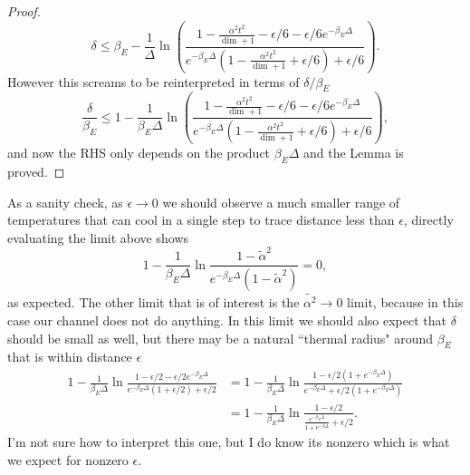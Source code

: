 \documentclass{article}
\begin{document}
\begin{proof}
\begin{equation}
    \delta \le \beta_E - \frac{1}{\Delta}  \ln \left( \frac{1 - \frac{\alpha^2 t^2}{\dim + 1} - \epsilon/ 6 - \epsilon/6 e^{-\beta_E \Delta}}{e^{-\beta_E \Delta}(1 - \frac{\alpha^2 t^2}{\dim + 1} + \epsilon/6) + \epsilon / 6} \right).
\end{equation}
However this screams to be reinterpreted in terms of $\delta / \beta_E$
\begin{equation}
    \frac{\delta}{\beta_E} \le 1 - \frac{1}{\beta_E \Delta}  \ln \left( \frac{1 - \frac{\alpha^2 t^2}{\dim + 1} - \epsilon/ 6 - \epsilon/6 e^{-\beta_E \Delta}}{e^{-\beta_E \Delta}(1 - \frac{\alpha^2 t^2}{\dim + 1} + \epsilon/6) + \epsilon / 6} \right),
\end{equation}
and now the RHS only depends on the product $\beta_E \Delta$ and the Lemma is proved.
\end{proof}


As a sanity check, as $\epsilon \to 0$ we should observe a much smaller range of temperatures that can cool in a single step to trace distance less than $\epsilon$, directly evaluating the limit above shows
\begin{equation}
    1 - \frac{1}{\beta_E \Delta} \ln \frac{1 - \widetilde{\alpha}^2}{e^{-\beta_E \Delta} (1 - \widetilde{\alpha}^2)} = 0,
\end{equation}
as expected. The other limit that is of interest is the $\widetilde{\alpha^2} \to 0$ limit, because in this case our channel does not do anything. In this limit we should also expect that $\delta$ should be small as well, but there may be a natural ``thermal radius" around $\beta_E$ that is within distance $\epsilon$
\begin{align}
    1 - \frac{1}{\beta_E \Delta} \ln \frac{1 - \epsilon /2 - \epsilon / 2 e^{-\beta_E \Delta}}{e^{-\beta_E \Delta}(1 + \epsilon / 2) + \epsilon/ 2} &= 1 - \frac{1}{\beta_E \Delta} \ln \frac{1 - \epsilon /2(1 + e^{-\beta_E \Delta})}{e^{-\beta_E \Delta} + \epsilon/ 2(1 + e^{-\beta_E \Delta}) }\\
    &= 1 - \frac{1}{\beta_E \Delta} \ln \frac{1 - \epsilon /2}{\frac{e^{-\beta_E \Delta}}{1 +e^{-\beta \Delta}} + \epsilon/ 2 }.
\end{align}
I'm not sure how to interpret this one, but I do know its nonzero which is what we expect for nonzero $\epsilon$.
\end{document}
